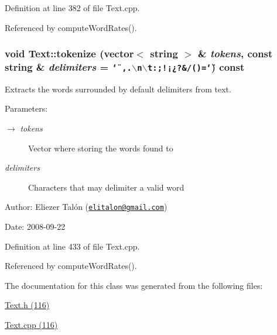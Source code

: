 Definition at line 382 of file Text.cpp.

Referenced by computeWordRates().\hypertarget{class_text_09f6b1e475da423ac81305500e05c7d6}{
\subsubsection[tokenize]{\setlength{\rightskip}{0pt plus 5cm}void Text::tokenize (vector$<$ string $>$ \& {\em tokens}, \/  const string \& {\em delimiters} = {\tt \char`\"{}~,.$\backslash$n$\backslash$t:;!¡¿?\&/()=\char`\"{}}) const}}
\label{class_text_09f6b1e475da423ac81305500e05c7d6}


Extracts the words surrounded by default delimiters from text. 

\begin{Desc}
\item[Parameters:]
\begin{description}
\item[\mbox{$\rightarrow$} {\em tokens}]Vector where storing the words found to \item[{\em delimiters}]Characters that may delimiter a valid word\end{description}
\end{Desc}
\begin{Desc}
\item[Author:]Eliezer Talón (\href{mailto:elitalon@gmail.com}{\tt elitalon@gmail.com}) \end{Desc}
\begin{Desc}
\item[Date:]2008-09-22 \end{Desc}


Definition at line 433 of file Text.cpp.

Referenced by computeWordRates().

The documentation for this class was generated from the following files:\begin{CompactItemize}
\item 
\hyperlink{_text_8h}{Text.h (116)}\item 
\hyperlink{_text_8cpp}{Text.cpp (116)}\end{CompactItemize}
